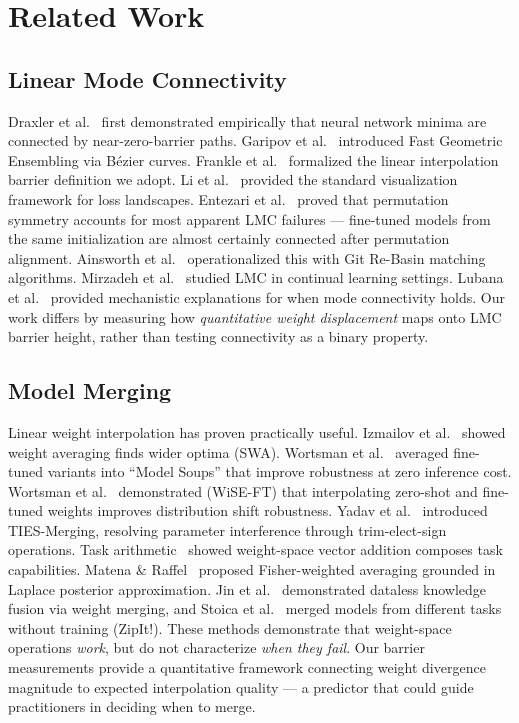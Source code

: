 \documentclass[11pt,a4paper]{article}
\begin{document}
\section{Related Work}

\subsection{Linear Mode Connectivity}

Draxler et al.~\cite{draxler2018barriers} first demonstrated empirically that neural network minima are connected by near-zero-barrier paths. Garipov et al.~\cite{garipov2018loss} introduced Fast Geometric Ensembling via B\'{e}zier curves. Frankle et al.~\cite{frankle2020lmc} formalized the linear interpolation barrier definition we adopt. Li et al.~\cite{li2018visualizing} provided the standard visualization framework for loss landscapes. Entezari et al.~\cite{entezari2022permutation} proved that permutation symmetry accounts for most apparent LMC failures — fine-tuned models from the same initialization are almost certainly connected after permutation alignment. Ainsworth et al.~\cite{ainsworth2023git} operationalized this with Git Re-Basin matching algorithms. Mirzadeh et al.~\cite{mirzadeh2021lmc} studied LMC in continual learning settings. Lubana et al.~\cite{lubana2023mechanistic} provided mechanistic explanations for when mode connectivity holds. Our work differs by measuring how \emph{quantitative weight displacement} maps onto LMC barrier height, rather than testing connectivity as a binary property.

\subsection{Model Merging}

Linear weight interpolation has proven practically useful. Izmailov et al.~\cite{izmailov2018averaging} showed weight averaging finds wider optima (SWA). Wortsman et al.~\cite{wortsman2022soups} averaged fine-tuned variants into ``Model Soups'' that improve robustness at zero inference cost. Wortsman et al.~\cite{wortsman2022wise} demonstrated (WiSE-FT) that interpolating zero-shot and fine-tuned weights improves distribution shift robustness. Yadav et al.~\cite{yadav2023ties} introduced TIES-Merging, resolving parameter interference through trim-elect-sign operations. Task arithmetic~\cite{ilharco2023editing} showed weight-space vector addition composes task capabilities. Matena \& Raffel~\cite{matena2022merging} proposed Fisher-weighted averaging grounded in Laplace posterior approximation. Jin et al.~\cite{jin2023dataless} demonstrated dataless knowledge fusion via weight merging, and Stoica et al.~\cite{stoica2024zipit} merged models from different tasks without training (ZipIt!). These methods demonstrate that weight-space operations \emph{work}, but do not characterize \emph{when they fail}. Our barrier measurements provide a quantitative framework connecting weight divergence magnitude to expected interpolation quality — a predictor that could guide practitioners in deciding when to merge.
\end{document}
